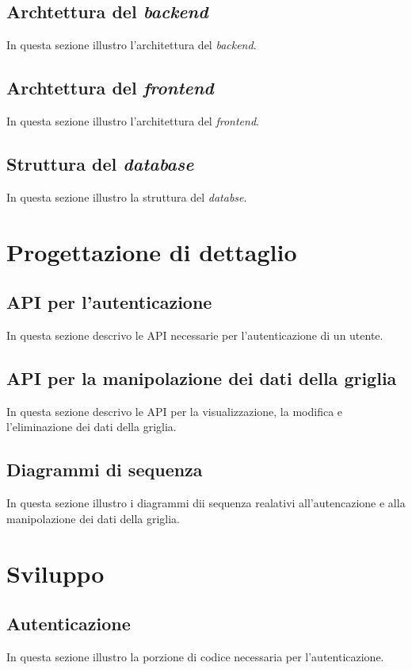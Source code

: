 \subsection{Archtettura del \emph{backend}}
In questa sezione illustro l'architettura del \emph{backend}.

\subsection{Archtettura del \emph{frontend}}
In questa sezione illustro l'architettura del \emph{frontend}.

\subsection{Struttura del \emph{database}}
In questa sezione illustro la struttura del \emph{databse}.

\section{Progettazione di dettaglio}

\subsection{API per l'autenticazione}
In questa sezione descrivo le API necessarie per l'autenticazione di un utente.

\subsection{API per la manipolazione dei dati della griglia}
In questa sezione descrivo le API per la visualizzazione, la modifica e l'eliminazione dei dati della griglia.

\subsection{Diagrammi di sequenza}
In questa sezione illustro i diagrammi dii sequenza realativi all'autencazione e alla manipolazione dei dati della griglia.

\section{Sviluppo}

\subsection{Autenticazione}
In questa sezione illustro la porzione di codice necessaria per l'autenticazione.

